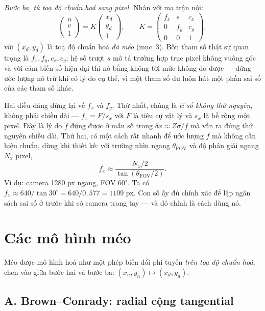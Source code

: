 \documentclass[../../marker.tex]{subfiles}
\begin{document}
\emph{Bước ba, từ toạ độ chuẩn hoá sang pixel.} Nhân với ma trận nội:
\[
\begin{pmatrix} u \\ v \\ 1 \end{pmatrix}
= K \begin{pmatrix} x_d \\ y_d \\ 1 \end{pmatrix},
\qquad
K = \begin{pmatrix} f_x & s & c_x \\ 0 & f_y & c_y \\ 0 & 0 & 1 \end{pmatrix},
\]
với \((x_d, y_d)\) là toạ độ chuẩn hoá \emph{đã méo} (mục~3). Bốn tham số thật sự quan trọng là \(f_x, f_y, c_x, c_y\); hệ số trượt \(s\) mô tả trường hợp trục pixel không vuông góc và với cảm biến số hiện đại thì nó bằng không tới mức không đo được --- đừng ước lượng nó trừ khi có lý do cụ thể, vì một tham số dư luôn hút một phần sai số của các tham số khác.

Hai điều đáng dừng lại về \(f_x\) và \(f_y\). Thứ nhất, chúng là \emph{tỉ số không thứ nguyên}, không phải chiều dài --- \(f_x = F/s_x\) với \(F\) là tiêu cự vật lý và \(s_x\) là bề rộng một pixel. Đây là lý do \(f\) đứng được ở mẫu số trong \(\delta x \approx Z\sigma/f\) mà vẫn ra đúng thứ nguyên chiều dài. Thứ hai, có một cách rất nhanh để ước lượng \(f\) mà không cần hiệu chuẩn, dùng khi thiết kế: với trường nhìn ngang \(\theta_{\text{FOV}}\) và độ phân giải ngang \(N_x\) pixel,
\[
f_x \approx \frac{N_x/2}{\tan(\theta_{\text{FOV}}/2)}.
\]
Ví dụ: camera 1280 px ngang, FOV \(60^\circ\). Ta có \(f_x \approx 640/\tan 30^\circ = 640/0{,}577 = 1109\) px. Con số ấy đủ chính xác để lập ngân sách sai số ở  trước khi có camera trong tay --- và đó chính là cách dùng nó.

\section{Các mô hình méo}

Méo được mô hình hoá như một phép biến đổi phi tuyến \emph{trên toạ độ chuẩn hoá}, chen vào giữa bước hai và bước ba: \((x_n, y_n) \mapsto (x_d, y_d)\).

\subsection{A. Brown--Conrady: radial cộng tangential}
\end{document}
